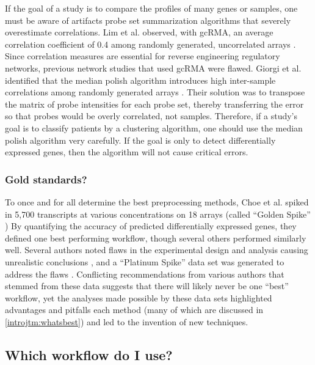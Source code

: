 If the goal of a study is to compare the profiles of many genes
or samples, one must be aware of artifacts 
probe set summarization algorithms that severely
overestimate correlations.
Lim et al. observed, with gcRMA, an average correlation coefficient of 0.4
among randomly generated, uncorrelated arrays \cite{Lim:2007gc}. 
Since correlation measures are essential
for reverse engineering regulatory networks, previous network
studies that used gcRMA were flawed. 
Giorgi et al. identified that the median polish algorithm introduces 
high inter-sample correlations among randomly generated arrays \cite{Giorgi:2010jw}.
Their solution was to transpose the matrix of probe intensities
for each probe set, thereby transferring the error so that probes
would be overly correlated, not samples.
Therefore, if a study's goal is to classify patients by a clustering
algorithm, one should use the median polish algorithm very carefully.
If the goal is only to detect differentially expressed genes, then
the algorithm will not cause critical errors.


\subsubsection{Gold standards?}

To once and for all determine the best
preprocessing methods, Choe et al. spiked in
5,700 transcripts at various concentrations 
on 18 arrays (called ``Golden Spike'' \cite{Choe:2005dd})
By quantifying the accuracy of predicted differentially expressed genes, they defined
one best performing workflow, though several others 
performed similarly well. Several authors
noted flaws in the experimental design and analysis
causing unrealistic conclusions \cite{Pearson:2008jr,Schuster:2007wr,
Dabney:2006ud,Irizarry:2006bq,Gaile:2007ei,Fodor:2007wb}, and
a ``Platinum Spike'' data set was generated to address the flaws \cite{Zhu:2010jx}.
Conflicting recommendations from various authors that stemmed from
these data suggests 
that there will likely never be one ``best'' workflow, yet the analyses
made possible by these data sets
highlighted advantages and pitfalls each method (many of which
are discussed in \ref{introjtm:whatsbest}) and led to the invention of new techniques.

\subsection{Which workflow do I use?}

